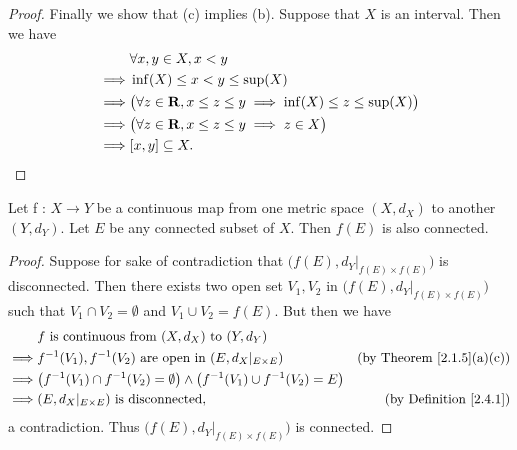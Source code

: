\begin{proof}
    Finally we show that (c) implies (b).
    Suppose that \(X\) is an interval.
    Then we have
    \begin{align*}
                 & \forall x, y \in X, x < y                                                        \\
        \implies & \inf(X) \leq x < y \leq \sup(X)                                                  \\
        \implies & \big(\forall z \in \mathbf{R}, x \leq z \leq y \implies \inf(X) \leq z \leq \sup(X)\big) \\
        \implies & \big(\forall z \in \mathbf{R}, x \leq z \leq y \implies z \in X\big)                     \\
        \implies & [x, y] \subseteq X.
    \end{align*}
\end{proof}

\begin{theorem}\label{2.4.6}
    Let f : \(X \to Y\) be a continuous map from one metric space \((X, d_X)\) to another \((Y, d_Y)\).
    Let \(E\) be any connected subset of \(X\).
    Then \(f(E)\) is also connected.
\end{theorem}

\begin{proof}
    Suppose for sake of contradiction that \(\big(f(E), d_Y|_{f(E) \times f(E)}\big)\) is disconnected.
    Then there exists two open set \(V_1, V_2\) in \(\big(f(E), d_Y|_{f(E) \times f(E)}\big)\) such that \(V_1 \cap V_2 = \emptyset\) and \(V_1 \cup V_2 = f(E)\).
    But then we have
    \begin{align*}
                 & f \text{ is continuous from } (X, d_X) \text{ to } (Y, d_Y)                                                                                 \\
        \implies & f^{-1}(V_1), f^{-1}(V_2) \text{ are open in } (E, d_X|_{E \times E})                                & \text{(by Theorem \ref{2.1.5}(a)(c))} \\
        \implies & \big(f^{-1}(V_1) \cap f^{-1}(V_2) = \emptyset\big) \land \big(f^{-1}(V_1) \cup f^{-1}(V_2) = E\big)                                         \\
        \implies & (E, d_X|_{E \times E}) \text{ is disconnected},                                                     & \text{(by Definition \ref{2.4.1})}
    \end{align*}
    a contradiction.
    Thus \(\big(f(E), d_Y|_{f(E) \times f(E)}\big)\) is connected.
\end{proof}

